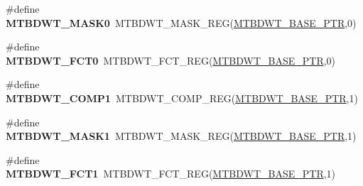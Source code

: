 \begin{DoxyCompactItemize}
\item 
\hypertarget{group___m_t_b_d_w_t___register___accessor___macros_ga67bf35c31a64cd369ef04e88e3c10a18}{}\#define {\bfseries M\+T\+B\+D\+W\+T\+\_\+\+M\+A\+S\+K0}~M\+T\+B\+D\+W\+T\+\_\+\+M\+A\+S\+K\+\_\+\+R\+E\+G(\hyperlink{group___m_t_b_d_w_t___peripheral_ga97d048bfb5a11293a38c444b8347ff42}{M\+T\+B\+D\+W\+T\+\_\+\+B\+A\+S\+E\+\_\+\+P\+T\+R},0)\label{group___m_t_b_d_w_t___register___accessor___macros_ga67bf35c31a64cd369ef04e88e3c10a18}

\item 
\hypertarget{group___m_t_b_d_w_t___register___accessor___macros_ga12dedaf447e980ce1562d39e22bc7636}{}\#define {\bfseries M\+T\+B\+D\+W\+T\+\_\+\+F\+C\+T0}~M\+T\+B\+D\+W\+T\+\_\+\+F\+C\+T\+\_\+\+R\+E\+G(\hyperlink{group___m_t_b_d_w_t___peripheral_ga97d048bfb5a11293a38c444b8347ff42}{M\+T\+B\+D\+W\+T\+\_\+\+B\+A\+S\+E\+\_\+\+P\+T\+R},0)\label{group___m_t_b_d_w_t___register___accessor___macros_ga12dedaf447e980ce1562d39e22bc7636}

\item 
\hypertarget{group___m_t_b_d_w_t___register___accessor___macros_gad33eb136896be3180b06c5ee963dc607}{}\#define {\bfseries M\+T\+B\+D\+W\+T\+\_\+\+C\+O\+M\+P1}~M\+T\+B\+D\+W\+T\+\_\+\+C\+O\+M\+P\+\_\+\+R\+E\+G(\hyperlink{group___m_t_b_d_w_t___peripheral_ga97d048bfb5a11293a38c444b8347ff42}{M\+T\+B\+D\+W\+T\+\_\+\+B\+A\+S\+E\+\_\+\+P\+T\+R},1)\label{group___m_t_b_d_w_t___register___accessor___macros_gad33eb136896be3180b06c5ee963dc607}

\item 
\hypertarget{group___m_t_b_d_w_t___register___accessor___macros_gae894a7aae5ee9a3e87a83d33342451da}{}\#define {\bfseries M\+T\+B\+D\+W\+T\+\_\+\+M\+A\+S\+K1}~M\+T\+B\+D\+W\+T\+\_\+\+M\+A\+S\+K\+\_\+\+R\+E\+G(\hyperlink{group___m_t_b_d_w_t___peripheral_ga97d048bfb5a11293a38c444b8347ff42}{M\+T\+B\+D\+W\+T\+\_\+\+B\+A\+S\+E\+\_\+\+P\+T\+R},1)\label{group___m_t_b_d_w_t___register___accessor___macros_gae894a7aae5ee9a3e87a83d33342451da}

\item 
\hypertarget{group___m_t_b_d_w_t___register___accessor___macros_gad659254c17bdfa6f4d25b8eeccc7eec2}{}\#define {\bfseries M\+T\+B\+D\+W\+T\+\_\+\+F\+C\+T1}~M\+T\+B\+D\+W\+T\+\_\+\+F\+C\+T\+\_\+\+R\+E\+G(\hyperlink{group___m_t_b_d_w_t___peripheral_ga97d048bfb5a11293a38c444b8347ff42}{M\+T\+B\+D\+W\+T\+\_\+\+B\+A\+S\+E\+\_\+\+P\+T\+R},1)\label{group___m_t_b_d_w_t___register___accessor___macros_gad659254c17bdfa6f4d25b8eeccc7eec2}


\end{DoxyCompactItemize}
